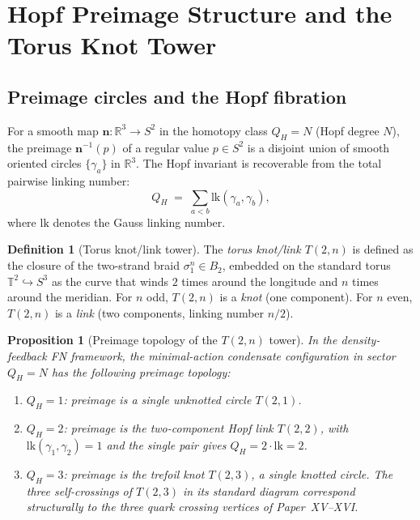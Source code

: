 \documentclass[11pt,a4paper]{article}
\newtheorem{proposition}[theorem]{Proposition}
\theoremstyle{definition}\newtheorem{definition}[theorem]{Definition}
\theoremstyle{remark}
\newcommand{\QH}{Q_H}
\newcommand{\lk}{\mathrm{lk}}
\begin{document}
\section{Hopf Preimage Structure and the Torus Knot Tower}
\label{P18:sec:preimage}

\subsection{Preimage circles and the Hopf fibration}
\label{P18:sec:preimage_hopf}

For a smooth map $\mathbf{n}:\mathbb{R}^3\to S^2$ in the homotopy
class $\QH=N$ (Hopf degree $N$), the preimage $\mathbf{n}^{-1}(p)$
of a regular value $p\in S^2$ is a disjoint union of smooth oriented
circles $\{\gamma_a\}$ in $\mathbb{R}^3$.  The Hopf invariant is
recoverable from the total pairwise linking number:
\begin{equation}
  \QH \;=\; \sum_{a<b} \lk(\gamma_a,\gamma_b),
  \label{P18:eq:hopf_link}
\end{equation}
where $\lk$ denotes the Gauss linking number.

\begin{definition}[Torus knot/link tower]
\label{P18:def:torus_tower}
The \emph{torus knot/link $T(2,n)$} is defined as the closure of
the two-strand braid $\sigma_1^n\in B_2$, embedded on the standard
torus $\mathbb{T}^2\hookrightarrow S^3$ as the curve that winds $2$
times around the longitude and $n$ times around the meridian.
For $n$ odd, $T(2,n)$ is a \emph{knot} (one component).
For $n$ even, $T(2,n)$ is a \emph{link} (two components, linking
number $n/2$).
\end{definition}

\begin{proposition}[Preimage topology of the $T(2,n)$ tower]
\label{P18:prop:preimage_tower}
In the density-feedback FN framework, the minimal-action condensate
configuration in sector $\QH=N$ has the following preimage topology:
\begin{enumerate}[noitemsep,label=(\roman*)]
\item $\QH=1$: preimage is a single unknotted circle $T(2,1)$.
\item $\QH=2$: preimage is the two-component Hopf link $T(2,2)$,
  with $\lk(\gamma_1,\gamma_2)=1$ and the single
  pair gives $\QH=2\cdot\lk=2$.
\item $\QH=3$: preimage is the trefoil knot $T(2,3)$, a single
  knotted circle.  The three self-crossings of $T(2,3)$ in its
  standard diagram correspond structurally to the three quark
  crossing vertices of Paper~XV--XVI.
\end{enumerate}
\end{proposition}
\end{document}
